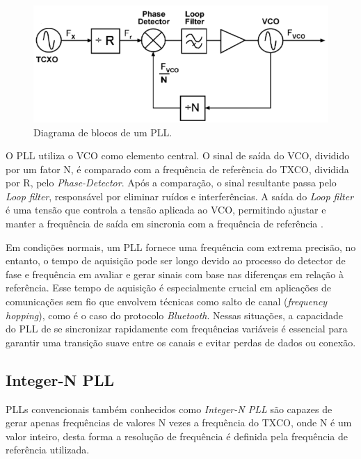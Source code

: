 \begin{figure}[h!]
	\caption{Diagrama de blocos de um PLL.}
	\begin{center}
		\includegraphics[scale=0.6]{img/pll_blocos.png}
	\end{center}
	\label{fig:pll_blocks}
\end{figure}

O PLL utiliza o VCO como elemento central. O sinal de saída do VCO, dividido por um fator N, é comparado com a frequência de referência do TXCO, dividida por R, pelo  \textit{Phase-Detector}. Após a comparação, o sinal resultante passa pelo \textit{Loop filter}, responsável por eliminar ruídos e interferências. A saída do \textit{Loop filter} é uma tensão que controla a tensão aplicada ao VCO, permitindo ajustar e manter a frequência de saída em sincronia com a frequência de referência \cite{barrett_1999_fractionalintegern}.

Em condições normais, um PLL fornece uma frequência com extrema precisão, no entanto, o tempo de aquisição pode ser longo devido ao processo do detector de fase e frequência em avaliar e gerar sinais com base nas diferenças em relação à referência. Esse tempo de aquisição é especialmente crucial em aplicações de comunicações sem fio que envolvem técnicas como salto de canal (\textit{frequency hopping}), como é o caso do protocolo \textit{Bluetooth}. Nessas situações, a capacidade do PLL de se sincronizar rapidamente com frequências variáveis é essencial para garantir uma transição suave entre os canais e evitar perdas de dados ou conexão.
\subsection{Integer-N PLL}

PLLs convencionais também conhecidos como \textit{Integer-N PLL} são capazes de gerar apenas frequências de valores N vezes a frequência do TXCO, onde N é um valor inteiro, desta forma a resolução de frequência é definida pela frequência de referência utilizada. 


